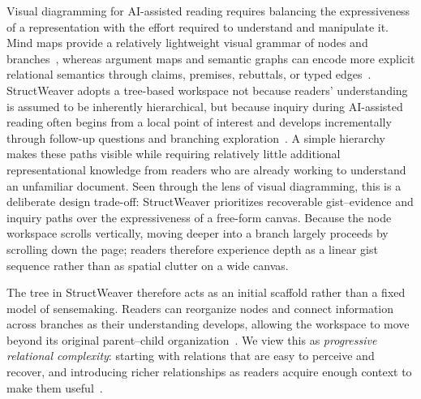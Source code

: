 \documentclass[manuscript,review,anonymous]{acmart}
\begin{document}
Visual diagramming for AI-assisted reading requires balancing the expressiveness of a representation with the effort required to understand and manipulate it. Mind maps provide a relatively lightweight visual grammar of nodes and branches~\cite{davies2011mind,hollan2000distributed}, whereas argument maps and semantic graphs can encode more explicit relational semantics through claims, premises, rebuttals, or typed edges~\cite{DWYER201016,A_Survey_on_Knowledge_Graphs,graphologue}. StructWeaver adopts a tree-based workspace not because readers' understanding is assumed to be inherently hierarchical, but because inquiry during AI-assisted reading often begins from a local point of interest and develops incrementally through follow-up questions and branching exploration~\cite{pirolli2005sensemaking,forage_chi26}. A simple hierarchy makes these paths visible while requiring relatively little additional representational knowledge from readers who are already working to understand an unfamiliar document. Seen through the lens of visual diagramming, this is a deliberate design trade-off: StructWeaver prioritizes recoverable gist--evidence and inquiry paths over the expressiveness of a free-form canvas. Because the node workspace scrolls vertically, moving deeper into a branch largely proceeds by scrolling down the page; readers therefore experience depth as a linear gist sequence rather than as spatial clutter on a wide canvas.

The tree in StructWeaver therefore acts as an initial scaffold rather than a fixed model of sensemaking. Readers can reorganize nodes and connect information across branches as their understanding develops, allowing the workspace to move beyond its original parent--child organization~\cite{liquidtext,graphologue}. We view this as \textit{progressive relational complexity}: starting with relations that are easy to perceive and recover, and introducing richer relationships as readers acquire enough context to make them useful~\cite{pirolli2005sensemaking,vidsense,10.1145/169059.169209}.
\end{document}
